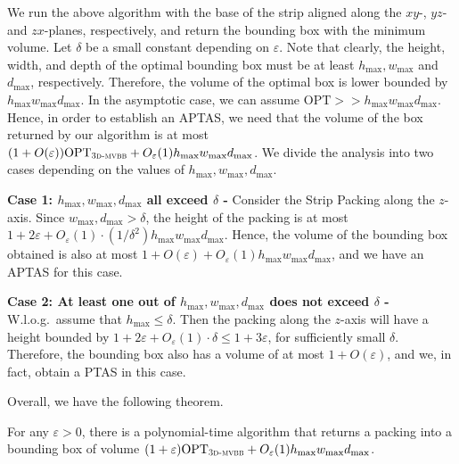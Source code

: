 \documentclass[a4paper,UKenglish,cleveref, autoref, thm-restate]{lipics-v2021}
\newcommand{\eps}{\varepsilon}
\newcommand{\opt}{\mathrm{OPT}}
\newcommand{\tmvc}{\textsc{3d-mvbb}\xspace}
\begin{document}
We run the above algorithm with the base of the strip aligned along the $xy$-, $yz$- and $zx$-planes, respectively, and return the bounding box with the minimum volume. Let $\delta$ be a small constant depending on $\varepsilon$. Note that clearly, the height, width, and depth of the optimal bounding box must be at least $h_{\max}, w_{\max}$ and $d_{\max}$, respectively. Therefore, the volume of the optimal box is lower bounded by $h_{\text{max}}w_{\text{max}}d_{\text{max}}$. 
In the asymptotic case, we can assume $\opt >> h_{\text{max}} w_{\text{max}} d_{\text{max}}$.
Hence, in order to establish an APTAS, we need that the volume of the box returned by our algorithm is at most $(1+O(\eps))\opt_{\tmvc}+O_{\eps}(1)h_{\text{max}}w_{\text{max}}d_{\text{max}}$. We divide the analysis into two cases depending on the values of $h_{\text{max}}, w_{\text{max}}, d_{\text{max}}$.

\textbf{Case 1: $h_{\text{max}}, w_{\text{max}}, d_{\text{max}}$ all exceed $\delta$ -} Consider the Strip Packing along the $z$-axis. Since $w_{\text{max}}, d_{\text{max}} > \delta$, the height of the packing is at most $1+2\varepsilon+O_{\varepsilon}(1)\cdot (1/\delta^2)h_{\text{max}}w_{\text{max}}d_{\text{max}}$. Hence, the volume of the bounding box obtained is also at most $1+O(\varepsilon)+O_{\varepsilon}(1)h_{\text{max}}w_{\text{max}}d_{\text{max}}$, and we have an APTAS for this case.

\textbf{Case 2: At least one out of $h_{\text{max}}, w_{\text{max}}, d_{\text{max}}$ does not exceed $\delta$ -} W.l.o.g.~assume that $h_{\text{max}}\le \delta$. Then the packing along the $z$-axis will have a height bounded by $1+2\varepsilon+O_{\varepsilon}(1)\cdot \delta \le 1+3\varepsilon$, for sufficiently small $\delta$. Therefore, the bounding box also has a volume of at most $1+O(\varepsilon)$, and we, in fact, obtain a PTAS in this case.

Overall, we have the following theorem.

\begin{theorem}
    For any $\eps >0$, there is a polynomial-time algorithm that returns a packing into a bounding box of volume $(1+\eps)\opt_{\tmvc}+O_{\eps}(1)h_{\max}w_{\max}d_{\max}$.
\end{theorem}
\end{document}
